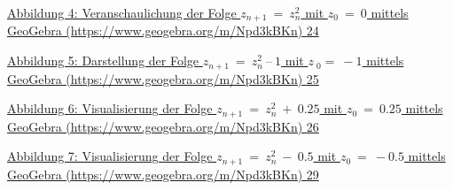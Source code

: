 \documentclass{book}
\begin{document}
\protect\hyperlink{_Toc167901654}{Abbildung 4: Veranschaulichung der
Folge \(z_{n + 1}\  = \ z_{n}^{2}\) mit \(z_{0}\  = \ 0\) mittels
GeoGebra (https://www.geogebra.org/m/Npd3kBKn)
\protect\hyperlink{_Toc167901654}{24}}

\protect\hyperlink{_Toc167901655}{Abbildung 5: Darstellung der Folge
\(z_{n + 1}\  = \ z_{n}^{2}\ –\ 1\) mit \({z\ }_{0} = \  - 1\) mittels
GeoGebra (https://www.geogebra.org/m/Npd3kBKn)
\protect\hyperlink{_Toc167901655}{25}}

\protect\hyperlink{_Toc167901656}{Abbildung 6: Visualisierung der Folge
\(z_{n + 1}\  = \ z_{n}^{2}\  + \ 0.25\) mit \(z_{0}\  = \ 0.25\)
mittels GeoGebra (https://www.geogebra.org/m/Npd3kBKn)
\protect\hyperlink{_Toc167901656}{26}}

\protect\hyperlink{_Toc167901657}{Abbildung 7: Visualisierung der Folge
\(z_{n + 1}\  = \ z_{n}^{2}\  - \ 0.5\) mit \(z_{0}\  = \  - 0.5\)
mittels GeoGebra (https://www.geogebra.org/m/Npd3kBKn)
\protect\hyperlink{_Toc167901657}{29}}
\end{document}
